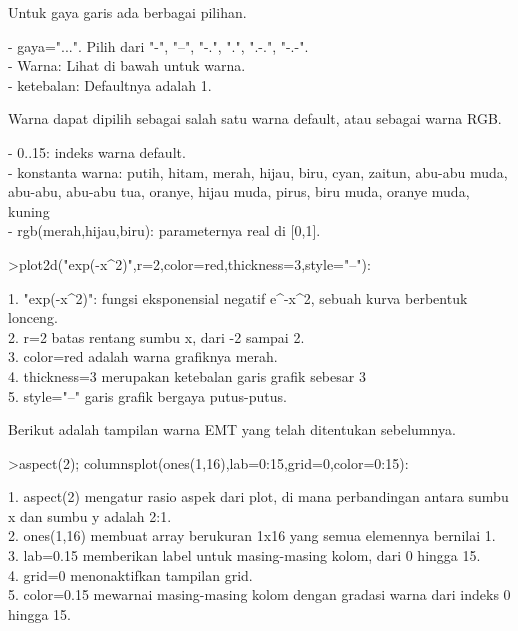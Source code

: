 \documentclass{article}
\begin{document}
\begin{eulernotebook}
\begin{eulercomment}
\begin{eulercomment}
\begin{eulercomment}
\begin{eulercomment}
\begin{eulercomment}
\begin{eulercomment}
\begin{eulercomment}
\begin{eulercomment}
\begin{eulercomment}
Untuk gaya garis ada berbagai pilihan.

- gaya="...". Pilih dari "-", "--", "-.", ".", ".-.", "-.-".\\
- Warna: Lihat di bawah untuk warna.\\
- ketebalan: Defaultnya adalah 1.

Warna dapat dipilih sebagai salah satu warna default, atau sebagai
warna RGB.

- 0..15: indeks warna default.\\
- konstanta warna: putih, hitam, merah, hijau, biru, cyan, zaitun,
abu-abu muda, abu-abu, abu-abu tua, oranye, hijau muda, pirus, biru
muda, oranye muda, kuning\\
- rgb(merah,hijau,biru): parameternya real di [0,1].
\end{eulercomment}
\begin{eulerprompt}
>plot2d("exp(-x^2)",r=2,color=red,thickness=3,style="--"):
\end{eulerprompt}
\begin{eulercomment}
1. "exp(-x\textasciicircum{}2)": fungsi eksponensial negatif e\textasciicircum{}-x\textasciicircum{}2, sebuah kurva
berbentuk lonceng.\\
2. r=2 batas rentang sumbu x, dari -2 sampai 2.\\
3. color=red adalah warna grafiknya merah.\\
4. thickness=3 merupakan ketebalan garis grafik sebesar 3\\
5. style="--" garis grafik bergaya putus-putus.

Berikut adalah tampilan warna EMT yang telah ditentukan sebelumnya.
\end{eulercomment}
\begin{eulerprompt}
>aspect(2); columnsplot(ones(1,16),lab=0:15,grid=0,color=0:15):
\end{eulerprompt}
\begin{eulercomment}
1. aspect(2) mengatur rasio aspek dari plot, di mana perbandingan
antara sumbu x dan sumbu y adalah 2:1.\\
2. ones(1,16) membuat array berukuran 1x16 yang semua elemennya
bernilai 1.\\
3. lab=0.15 memberikan label untuk masing-masing kolom, dari 0 hingga
15.\\
4. grid=0 menonaktifkan tampilan grid.\\
5. color=0.15 mewarnai masing-masing kolom dengan gradasi warna dari
indeks 0 hingga 15.


\end{eulercomment}
\end{eulercomment}
\end{eulercomment}
\end{eulercomment}
\end{eulercomment}
\end{eulercomment}
\end{eulercomment}
\end{eulercomment}
\end{eulercomment}
\end{eulernotebook}
\end{document}
